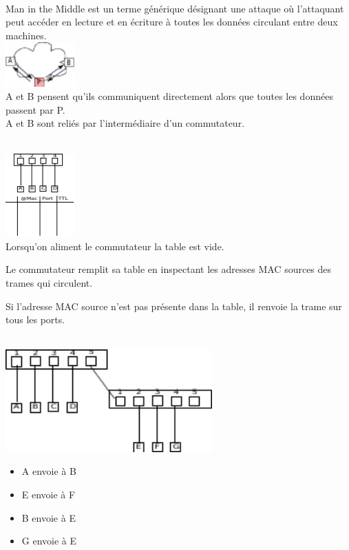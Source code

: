  \\

 Man in the Middle est un terme générique désignant une attaque où l'attaquant peut accéder en lecture et en écriture à toutes les données circulant entre deux machines. \\

\includegraphics[width=100px]{Images/05_MIM.pdf}\\
A et B pensent qu'ils communiquent directement alors que toutes les données passent par P.\\

 A et B sont reliés par l'intermédiaire d'un commutateur.

\\
\includegraphics[width=100px]{Images/06_commutateur.pdf}\\
Lorsqu'on aliment le commutateur la table est vide. 
\par Le commutateur remplit sa table en inspectant les adresses MAC sources des trames qui circulent.
\par Si l'adresse MAC source n'est pas présente dans la table, il renvoie la trame sur tous les ports.

\\
\includegraphics[width=300px]{Images/07_exemple.pdf}\\
\begin{itemize}
	\item A envoie à B
	\item E envoie à F
	\item B envoie à E
	\item G envoie à E
\end{itemize}

